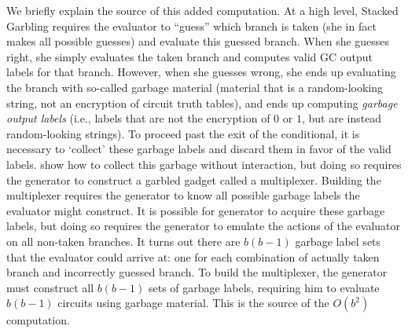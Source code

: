 We briefly explain the source of this added computation.
At a high level, Stacked Garbling requires the evaluator to
``guess'' which branch is taken (she in fact makes all possible
guesses) and evaluate this guessed branch.
When she guesses right, she simply evaluates the taken branch and
computes valid GC output labels for that branch.
However, when she guesses wrong, she ends up evaluating the branch
with so-called garbage material (material that is a random-looking string, not
an encryption of circuit truth tables), and ends up computing
\emph{garbage output labels} (i.e., labels that are not the encryption
of $0$ or $1$, but are instead random-looking strings).
%
To proceed past the exit of the conditional, it is necessary to
`collect' these garbage labels and discard them in favor of the valid
labels.
%
\cite{EPRINT:HeaKol20b} show how to collect this garbage without
interaction, but doing so requires the generator to construct a
garbled gadget called a multiplexer.
Building the multiplexer requires the generator to know all possible
garbage labels the evaluator might construct.
%
It is possible for generator to acquire these garbage labels, but
doing so requires the generator to emulate the actions of the
evaluator on all non-taken branches.
It turns out there are $b(b-1)$ garbage label sets that the evaluator
could arrive at: one for each combination of actually taken branch and
incorrectly guessed branch.
%
To build the multiplexer, the generator must construct all $b(b-1)$
sets of garbage labels, requiring him to evaluate $b(b-1)$ circuits
using garbage material.
This is the source of the $O(b^2)$ computation.

